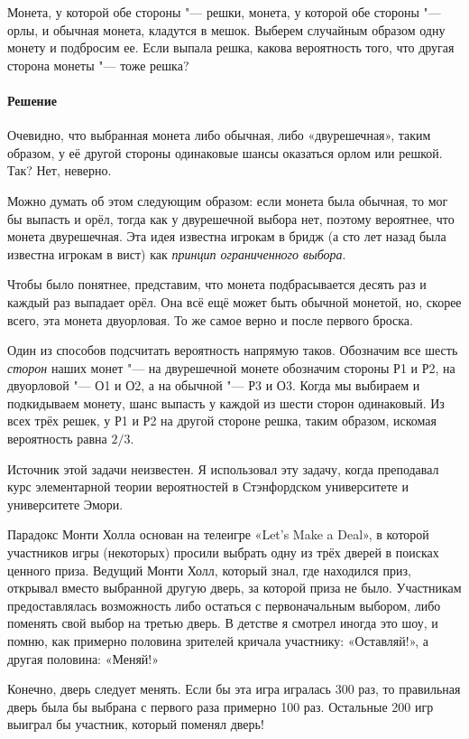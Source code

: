 \documentclass[twoside]{book}
\begin{document}
Монета, у которой обе стороны "--- решки, монета, у которой обе стороны "--- орлы, и обычная монета, кладутся в мешок.
Выберем случайным образом одну монету и подбросим ее.
Если выпала решка,
какова вероятность того, что другая сторона монеты "--- тоже решка?

\paragraph{Решение}
Очевидно, что выбранная монета либо обычная, либо «двурешечная», таким образом, у её другой стороны одинаковые шансы оказаться орлом или решкой.
Так?
Нет, неверно.

Можно думать об этом следующим образом: если монета была обычная, то
мог бы выпасть и орёл, тогда как у двурешечной выбора нет, поэтому вероятнее, что монета двурешечная.
Эта идея известна игрокам в бридж (а сто лет назад была известна игрокам в вист) как \emph{принцип ограниченного выбора}.

Чтобы было понятнее, представим, что монета подбрасывается десять раз и каждый раз выпадает орёл.
Она всё ещё может быть обычной монетой, но, скорее всего, эта монета двуорловая.
То же самое верно и после первого броска.

Один из способов подсчитать вероятность напрямую таков.
Обозначим все шесть \emph{сторон} наших монет "---
на двурешечной монете обозначим стороны Р1 и Р2, на двуорловой "--- О1 и О2, а на обычной "--- Р3 и О3.
Когда мы выбираем и подкидываем монету, шанс выпасть у каждой из шести сторон одинаковый.
Из всех трёх решек, у Р1 и Р2 на другой стороне решка, таким образом, искомая вероятность равна $2/3$.\heart

\medskip
Источник этой задачи неизвестен. Я использовал эту задачу, когда
преподавал курс элементарной теории вероятностей в Стэнфордском
университете и университете Эмори. 



Парадокс Монти Холла основан на телеигре «Let’s Make a Deal», в
которой участников игры (некоторых) просили выбрать одну из трёх
дверей в поисках ценного приза.
Ведущий Монти Холл, который знал, где
находился приз, открывал вместо выбранной другую дверь, за которой
приза не было.
Участникам предоставлялась возможность либо остаться с
первоначальным выбором, либо поменять свой выбор на третью дверь.
В
детстве я смотрел иногда это шоу, и помню, как примерно половина
зрителей кричала участнику: «Оставляй!», а другая половина: «Меняй!»

Конечно, дверь следует менять.
Если бы эта игра игралась 300 раз, то правильная дверь была бы выбрана с первого раза примерно 100 раз.
Остальные 200 игр выиграл бы участник, который поменял дверь!
\end{document}
